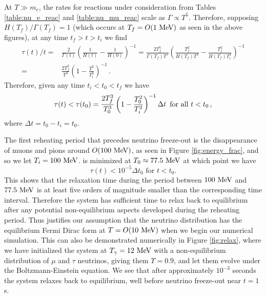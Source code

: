 At $T\gg m_e$, the rates for reactions under consideration from Tables \ref{table:nu_e_reac} and \ref{table:nu_mu_reac} scale as $\Gamma\propto T^5$.  Therefore, supposing $H(T_f)/\Gamma(T_f)=1$ (which occurs at $T_f=O(1\text{ MeV})$ as seen in the above figures), at any time $t_f>t>t_i$ we find 
\begin{align}\label{relax_time}
\tau(t)/t=&\frac{2}{\Gamma(t)}\left(\frac{1}{H(t)}-\frac{1}{H(0)}\right)^{-1}=\frac{2T_f^5}{\Gamma(T_f)T^5}\left(\frac{T_f^2}{H(T_f)T^2}-\frac{T_f^2}{H(T_f)T_i^2}\right)^{-1}\\
=&\frac{2T_f^3}{T^3}\left(1-\frac{T^2}{T_i^2}\right)^{-1}\,.
\end{align}
Therefore, given any time $t_i<t_0<t_f$ we have
\begin{equation}\label{ch6:tau_eq}
\tau(t)<\tau(t_0)=\frac{2T_f^3}{T_0^3}\left(1-\frac{T_0^2}{T_i^2}\right)^{-1}\Delta t \text{ \,for all } t<t_0\,,
\end{equation}
where $\Delta t=t_0-t_i=t_0$.

 The first reheating period that precedes neutrino freeze-out is the disappearance of muons and pions around $O(100\text{ MeV})$, as seen in Figure \ref{fig:energy_frac}, and so we let $T_i=100\text{ MeV}$.  is minimized at $T_0\approx 77.5\text{ MeV}$ at which point we have 
\begin{equation}
\tau(t)<10^{-5} \Delta t_0 \text{ for } t<t_0.
\end{equation}
This shows that the relaxation time during the period between $100\text{ MeV}$ and $77.5\text{ MeV}$ is at least five orders of magnitude smaller than the corresponding time interval.  Therefore the system has sufficient time to relax back to equilibrium after any potential non-equilibrium aspects developed during the reheating period.  Thus justifies our assumption that the neutrino distribution has the equilibrium Fermi Dirac form at $T=O(10 \text{ MeV})$ when we begin our numerical simulation. This can also be demonstrated numerically in Figure \ref{fig:relax}, where we have initialized the system at $T_\gamma=12\text{ MeV}$ with a non-equilibrium distribution of $\mu$ and $\tau$ neutrinos, giving them $\Upsilon=0.9$, and let them evolve under the Boltzmann-Einstein equation.  We see that after approximately $10^{-3}$ seconds the system relaxes back to equilibrium, well before neutrino freeze-out near $t=1$s.

